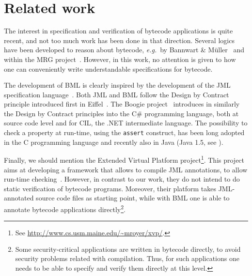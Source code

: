 

\section{Related work}
The interest in specification and verification of bytecode
applications is quite recent, and not too much work has been done in
that direction. Several logics have been developed to reason about
bytecode, \emph{e.g.}~by Bannwart \& M\"uller~\cite{BM05plb}
and within the MRG project~\cite{AspinallEtAl:TPHOLs2004}. However,
in this work, no attention is given to how one can conveniently write
understandable specifications for bytecode.

The development of BML is clearly inspired by the development of the
JML specification language~\cite{december-jml}. Both JML and
BML follow the Design by Contract principle introduced first in
Eiffel~\cite{M97oos}. The Boogie project~\cite{leinoWPUP}
introduces in similarly the Design by Contract principles into the C\#
programming language, both at source code level and for CIL, the .NET
intermediate language.  The possibility to check a property at
run-time, using the \texttt{assert} construct, has been long 
adopted in the C programming language and recently also in Java (Java
1.5, see \cite[\S 14.10]{JLS}). 

Finally, we should mention the Extended Virtual Platform
project\footnote{See
\url{http://www.cs.usm.maine.edu/~mroyer/xvp/}.}. This project aims at
developing a framework that allows to compile JML annotations, to
allow run-time checking~\cite{AlagicXVP05}. However, in contrast to
our work, they do not intend to do static verification of bytecode
programs. Moreover, their platform takes JML-annotated source code
files as starting point, while with BML one is able to annotate
bytecode applications directly\footnote{Some security-critical
applications are written in bytecode directly, to avoid security
problems related with compilation. Thus, for such applications one
needs to be able to specify and verify them directly at this level.}.
